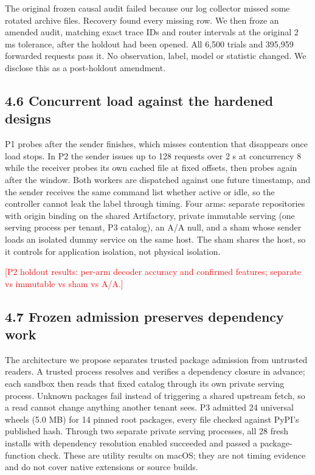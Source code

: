 \documentclass[11pt]{article}
\newcommand{\pending}[1]{\textcolor{red}{[#1]}}
\begin{document}
The original frozen causal audit failed because our log collector missed some rotated archive files. Recovery found every missing row. We then froze an amended audit, matching exact trace IDs and router intervals at the original 2 ms tolerance, after the holdout had been opened. All 6,500 trials and 395,959 forwarded requests pass it. No observation, label, model or statistic changed. We disclose this as a post-holdout amendment.

\subsection*{4.6 Concurrent load against the hardened designs}
P1 probes after the sender finishes, which misses contention that disappears once load stops. In P2 the sender issues up to 128 requests over 2 s at concurrency 8 while the receiver probes its own cached file at fixed offsets, then probes again after the window. Both workers are dispatched against one future timestamp, and the sender receives the same command list whether active or idle, so the controller cannot leak the label through timing. Four arms: separate repositories with origin binding on the shared Artifactory, private immutable serving (one serving process per tenant, P3 catalog), an A/A null, and a sham whose sender loads an isolated dummy service on the same host. The sham shares the host, so it controls for application isolation, not physical isolation.

\pending{P2 holdout results: per-arm decoder accuracy and confirmed features; separate vs immutable vs sham vs A/A.}

\subsection*{4.7 Frozen admission preserves dependency work}
The architecture we propose separates trusted package admission from untrusted readers. A trusted process resolves and verifies a dependency closure in advance; each sandbox then reads that fixed catalog through its own private serving process. Unknown packages fail instead of triggering a shared upstream fetch, so a read cannot change anything another tenant sees. P3 admitted 24 universal wheels (5.0 MB) for 14 pinned root packages, every file checked against PyPI's published hash. Through two separate private serving processes, all 28 fresh installs with dependency resolution enabled succeeded and passed a package-function check. These are utility results on macOS; they are not timing evidence and do not cover native extensions or source builds.
\end{document}
